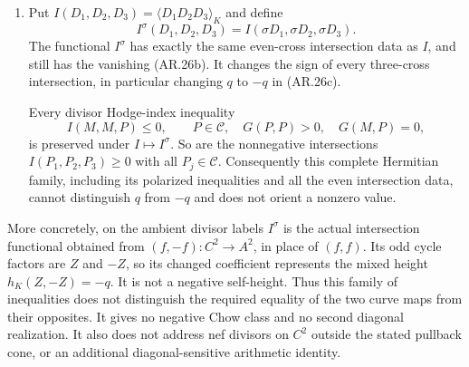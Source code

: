\begin{proposition}[AR-26]
\begin{enumerate}
linear involution
\[
 \sigma(P_{1,R}+P_{2,S}+Q_B)=P_{1,R}+P_{2,S}-Q_B.         \tag{AR.26d}
\]
It preserves the geometric intersection pairing $G$ on $\mathcal D$.
It also preserves the cone $\mathcal C$ of classes obtained by pulling
back canonical nef bundles associated with positive semidefinite
Hermitian matrices
\[
 H=\begin{pmatrix}R&B\\ B^\dagger&S\end{pmatrix}
 \quad\hbox{on }E^3\times E^3.
\]
\item Put $I(D_1,D_2,D_3)=\langle D_1D_2D_3\rangle_K$ and define
\[
 I^\sigma(D_1,D_2,D_3)=I(\sigma D_1,\sigma D_2,\sigma D_3).
\]
The functional $I^\sigma$ has exactly the same even-cross intersection
data as $I$, and still has the vanishing (AR.26b).  It changes the sign
of every three-cross intersection, in particular changing $q$ to
$-q$ in (AR.26c).

Every divisor Hodge-index inequality
\[
 I(M,M,P)\le0,\qquad
 P\in\mathcal C,\quad G(P,P)>0,\quad G(M,P)=0,           \tag{AR.26e}
\]
is preserved under $I\mapsto I^\sigma$.  So are the nonnegative
intersections $I(P_1,P_2,P_3)\ge0$ with all $P_j\in\mathcal C$.
Consequently this complete Hermitian family, including its polarized
inequalities and all the even intersection data, cannot distinguish
$q$ from $-q$ and does not orient a nonzero value.
\end{enumerate}
More concretely, on the ambient divisor labels $I^\sigma$ is the
actual intersection functional obtained from
$(f,-f):C^2\to A^2$, in place of $(f,f)$.  Its odd cycle factors are
$Z$ and $-Z$, so its changed coefficient represents the mixed height
$h_K(Z,-Z)=-q$.  It is not a negative self-height.  Thus this family
of inequalities does not distinguish the required equality of the
two curve maps from their opposites.  It gives no negative Chow
class and no second diagonal realization.  It also does not address
nef divisors on $C^2$ outside the stated pullback cone, or an
additional diagonal-sensitive arithmetic identity.
\end{proposition}

